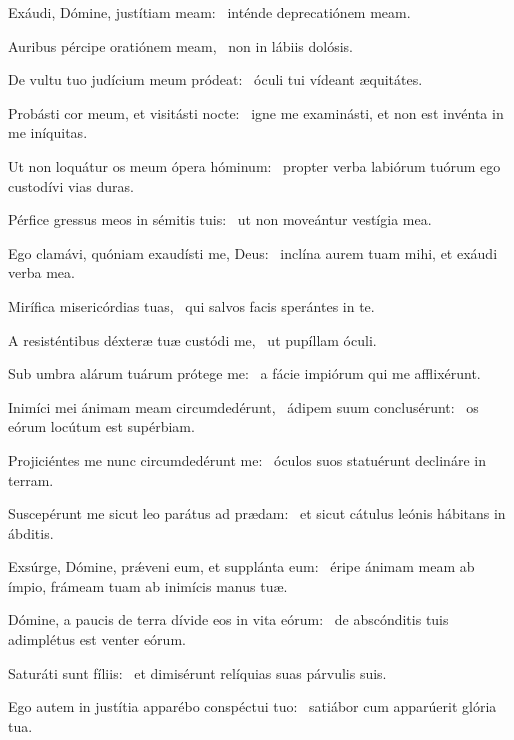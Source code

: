 \item Exáudi, Dómine, justítiam meam:~\psstar{} inténde deprecatiónem meam.

\item Auribus pércipe oratiónem meam,~\psstar{} non in lábiis dolósis.

\item De vultu tuo judícium meum pródeat:~\psstar{} óculi tui vídeant æquitátes.

\item Probásti cor meum, et visitásti nocte:~\psstar{} igne me examinásti, et non est invénta in me iníquitas.

\item Ut non loquátur os meum ópera hóminum:~\psstar{} propter verba labiórum tuórum ego custodívi vias duras.

\item Pérfice gressus meos in sémitis tuis:~\psstar{} ut non moveántur vestígia mea.

\item Ego clamávi, quóniam exaudísti me, Deus:~\psstar{} inclína aurem tuam mihi, et exáudi verba mea.

\item Mirífica misericórdias tuas,~\psstar{} qui salvos facis sperántes in te.

\item A resisténtibus déxteræ tuæ custódi me,~\psstar{} ut pupíllam óculi.

\item Sub umbra alárum tuárum prótege me:~\psstar{} a fácie impiórum qui me afflixérunt.

\item Inimíci mei ánimam meam circumdedérunt,~\pscross{} ádipem suum conclusérunt:~\psstar{} os eórum locútum est supérbiam.

\item Projiciéntes me nunc circumdedérunt me:~\psstar{} óculos suos statuérunt declináre in terram.

\item Suscepérunt me sicut leo parátus ad prædam:~\psstar{} et sicut cátulus leónis hábitans in ábditis.

\item Exsúrge, Dómine, prǽveni eum, et supplánta eum:~\psstar{} éripe ánimam meam ab ímpio, frámeam tuam ab inimícis manus tuæ.

\item Dómine, a paucis de terra dívide eos in vita eórum:~\psstar{} de abscónditis tuis adimplétus est venter eórum.

\item Saturáti sunt fíliis:~\psstar{} et dimisérunt relíquias suas párvulis suis.

\item Ego autem in justítia apparébo conspéctui tuo:~\psstar{} satiábor cum apparúerit glória tua.
